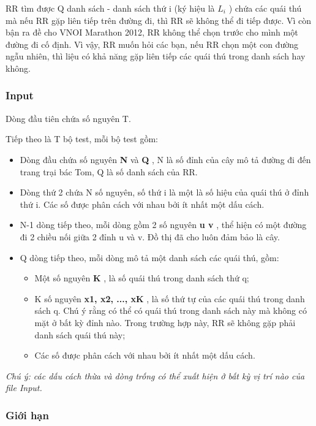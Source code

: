 RR tìm được Q danh sách - danh sách thứ i (ký hiệu là $L_{i}$ ) chứa các quái thú mà nếu RR gặp liên tiếp trên đường đi, thì RR sẽ không thể đi tiếp được. Vì còn bận ra đề cho VNOI Marathon 2012, RR không thể chọn trước cho mình một đường đi cố định. Vì vậy, RR muốn hỏi các bạn, nếu RR chọn một con đường ngẫu nhiên, thì liệu có khả năng gặp liên tiếp các quái thú trong danh sách hay không.

\subsubsection{Input}

Dòng đầu tiên chứa số nguyên T.

Tiếp theo là T bộ test, mỗi bộ test gồm:
\begin{itemize}
	\item Dòng đầu chứa số nguyên \textbf{ N } và \textbf{ Q } , N là số đỉnh của cây mô tả đường đi đến trang trại bác Tom, Q là số danh sách của RR.
	\item Dòng thứ 2 chứa N số nguyên, số thứ i là một là số hiệu của quái thú ở đỉnh thứ i. Các số được phân cách với nhau bởi ít nhất một dấu cách.
	\item N-1 dòng tiếp theo, mỗi dòng gồm 2 số nguyên \textbf{ u v } , thể hiện có một đường đi 2 chiều nối giữa 2 đỉnh u và v. Đồ thị đã cho luôn đảm bảo là cây.
	\item Q dòng tiếp theo, mỗi dòng mô tả một danh sách các quái thú, gồm:
\begin{itemize}
	\item Một số nguyên \textbf{ K } , là số quái thú trong danh sách thứ q;
	\item K số nguyên \textbf{ x1, x2, ..., xK } , là số thứ tự của các quái thú trong danh sách q. Chú ý rằng có thể có quái thú trong danh sách này mà không có mặt ở bất kỳ đỉnh nào. Trong trường hợp này, RR sẽ không gặp phải danh sách quái thú này;
\end{itemize}
\begin{itemize}
	\item Các số được phân cách với nhau bởi ít nhất một dấu cách.
\end{itemize}
\end{itemize}

\emph{Chú ý: các dấu cách thừa và dòng trống có thể xuất hiện ở bất kỳ vị trí nào của file Input. }

\subsubsection{Giới hạn}


